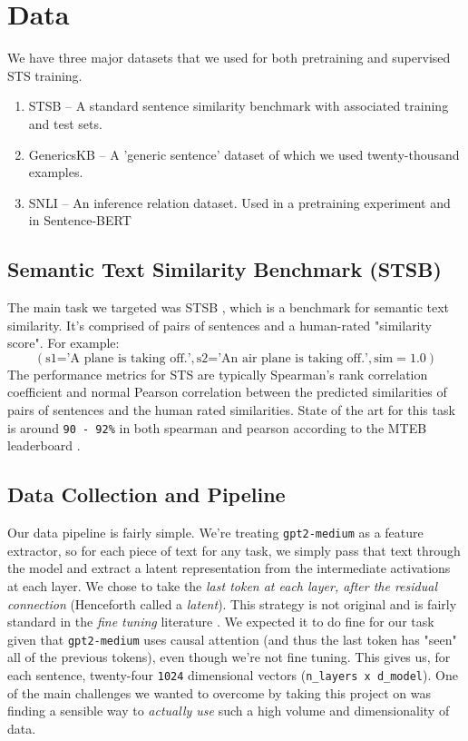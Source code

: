 \documentclass[14pt]{article}
\begin{document}
\section{Data}
We have three major datasets that we used for both pretraining and supervised STS training.
\begin{enumerate}
    \item STSB \cite{STS} -- A standard sentence similarity benchmark with associated training and test sets.
    \item GenericsKB \cite{bhakthavatsalam2020genericskbknowledgebasegeneric} -- A 'generic sentence' dataset of which we used twenty-thousand examples.
    \item SNLI \cite{snli} -- An inference relation dataset. Used in a pretraining experiment and in Sentence-BERT \cite{reimers2019sentencebertsentenceembeddingsusing}
\end{enumerate}

\subsection{Semantic Text Similarity Benchmark (STSB)} \label{STS-section}
The main task we targeted was STSB \cite{STS}, which is a benchmark for semantic text similarity. It's comprised of pairs of sentences and a human-rated "similarity score". For example:
$$
(\text{s1='A plane is taking off.'}, \text{s2='An air plane is taking off.'}, \text{sim}=1.0)
$$
The performance metrics for STS are typically Spearman's rank correlation coefficient and normal Pearson correlation between the predicted similarities of pairs of sentences and the human rated similarities. State of the art for this task is around \verb|90 - 92%| in both spearman and pearson according to the MTEB leaderboard \cite{muennighoff2022mteb}.

\subsection{Data Collection and Pipeline} \label{latent}
Our data pipeline is fairly simple. We're treating \verb|gpt2-medium| as a feature extractor, so for each piece of text for any task, we simply pass that text through the model and extract a latent representation from the intermediate activations at each layer. We chose to take the \textit{last token at each layer, after the residual connection} (Henceforth called a \textit{latent}). This strategy is not original and is fairly standard in the \textit{fine tuning} literature \cite{LLMEmbed}. We expected it to do fine for our task given that \verb|gpt2-medium| uses causal attention (and thus the last token has "seen" all of the previous tokens), even though we're not fine tuning. This gives us, for each sentence, twenty-four \verb|1024| dimensional vectors (\verb|n_layers x d_model|). One of the main challenges we wanted to overcome by taking this project on was finding a sensible way to \textit{actually use} such a high volume and dimensionality of data.
\end{document}
